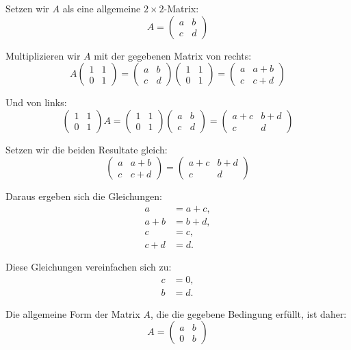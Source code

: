 Setzen wir \( A \) als eine allgemeine \( 2 \times 2 \)-Matrix:
\[
A = \begin{pmatrix}
a & b \\
c & d
\end{pmatrix}
\]

Multiplizieren wir \( A \) mit der gegebenen Matrix von rechts:
\[
A \begin{pmatrix}
1 & 1 \\
0 & 1
\end{pmatrix}
=
\begin{pmatrix}
a & b \\
c & d
\end{pmatrix}
\begin{pmatrix}
1 & 1 \\
0 & 1
\end{pmatrix}
=
\begin{pmatrix}
a & a+b \\
c & c+d
\end{pmatrix}
\]

Und von links:
\[
\begin{pmatrix}
1 & 1 \\
0 & 1
\end{pmatrix}
A
=
\begin{pmatrix}
1 & 1 \\
0 & 1
\end{pmatrix}
\begin{pmatrix}
a & b \\
c & d
\end{pmatrix}
=
\begin{pmatrix}
a+c & b+d \\
c & d
\end{pmatrix}
\]

Setzen wir die beiden Resultate gleich:
\[
\begin{pmatrix}
a & a+b \\
c & c+d
\end{pmatrix}
=
\begin{pmatrix}
a+c & b+d \\
c & d
\end{pmatrix}
\]

Daraus ergeben sich die Gleichungen:
\begin{align*}
a &= a+c, \\
a+b &= b+d, \\
c &= c, \\
c+d &= d.
\end{align*}

Diese Gleichungen vereinfachen sich zu:
\begin{align*}
c &= 0, \\
b &= d.
\end{align*}

Die allgemeine Form der Matrix \( A \), die die gegebene Bedingung erfüllt, ist daher:
\[
A = \begin{pmatrix}
a & b \\
0 & b
\end{pmatrix}
\]